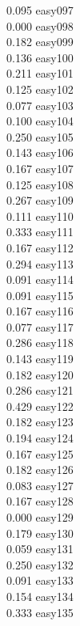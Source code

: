 \documentclass[10pt]{article}
\begin{document}
\begin{enumerate}
\begin{enumerate}
\begin{multicols}{5}
            0.095 easy097\\
            0.000 easy098\\
            0.182 easy099\\
            0.136 easy100\\
            0.211 easy101\\
            0.125 easy102\\
            0.077 easy103\\
            0.100 easy104\\
            0.250 easy105\\
            0.143 easy106\\
            0.167 easy107\\
            0.125 easy108\\
            0.267 easy109\\
            0.111 easy110\\
            0.333 easy111\\
            0.167 easy112\\
            0.294 easy113\\
            0.091 easy114\\
            0.091 easy115\\
            0.167 easy116\\
            0.077 easy117\\
            0.286 easy118\\
            0.143 easy119\\
            0.182 easy120\\
            0.286 easy121\\
            0.429 easy122\\
            0.182 easy123\\
            0.194 easy124\\
            0.167 easy125\\
            0.182 easy126\\
            0.083 easy127\\
            0.167 easy128\\
            0.000 easy129\\
            0.179 easy130\\
            0.059 easy131\\
            0.250 easy132\\
            0.091 easy133\\
            0.154 easy134\\
            0.333 easy135\\

\end{multicols}
\end{enumerate}
\end{enumerate}
\end{document}
